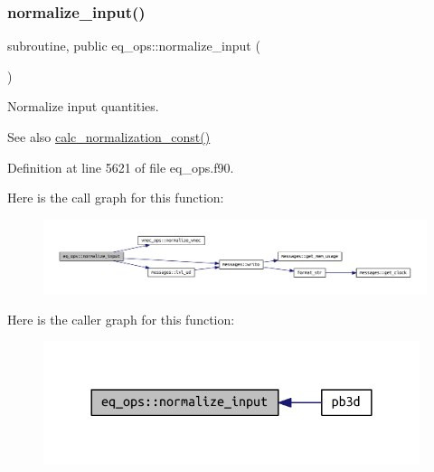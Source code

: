 \subsubsection{\texorpdfstring{normalize\+\_\+input()}{normalize\_input()}}
{\footnotesize\ttfamily subroutine, public eq\+\_\+ops\+::normalize\+\_\+input (\begin{DoxyParamCaption}{ }\end{DoxyParamCaption})}



Normalize input quantities. 

\begin{DoxySeeAlso}{See also}
\hyperlink{namespaceeq__ops_a7cd38586e386e1bc684a327ebcc4c1de}{calc\+\_\+normalization\+\_\+const()} 
\end{DoxySeeAlso}


Definition at line 5621 of file eq\+\_\+ops.\+f90.

Here is the call graph for this function\+:\nopagebreak
\begin{figure}[H]
\begin{center}
\leavevmode
\includegraphics[width=350pt]{namespaceeq__ops_a1b4c764da73624722d7e76498a2b80a9_cgraph}
\end{center}
\end{figure}
Here is the caller graph for this function\+:\nopagebreak
\begin{figure}[H]
\begin{center}
\leavevmode
\includegraphics[width=312pt]{namespaceeq__ops_a1b4c764da73624722d7e76498a2b80a9_icgraph}
\end{center}
\end{figure}
\mbox{\label{namespaceeq__ops_a8082c12510696bd8ffdd0deef41860c2}} 
